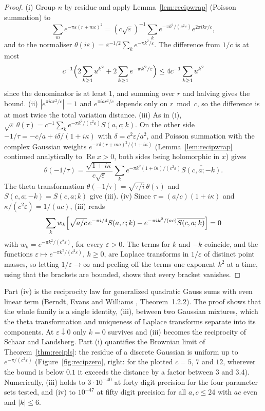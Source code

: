 \begin{proof}
(i) Group $n$ by residue and apply Lemma~\ref{lem:recipwrap} (Poisson summation) to
\[
\sum_me^{-\pi\varepsilon(r+mc)^2}=(c\sqrt\varepsilon)^{-1}\sum_ke^{-\pi k^2/(c^2\varepsilon)}e^{2\pi ikr/c},
\]
and to the normaliser $\theta(i\varepsilon)=\varepsilon^{-1/2}\sum_ke^{-\pi k^2/\varepsilon}$. The difference from $1/c$ is at most
\[
c^{-1}\Bigl(2\sum_{k\ge1}u^{k^2}+2\sum_{k\ge1}e^{-\pi k^2/\varepsilon}\Bigr)\le4c^{-1}\sum_{k\ge1}u^{k^2}
\]
since the denominator is at least $1$, and summing over $r$ and halving gives the bound. (ii) $|e^{\pi iar^2/c}|=1$ and $e^{\pi iar^2/c}$ depends only on $r\bmod c$, so the difference is at most twice the total variation distance. (iii) As in (i), $\sqrt\varepsilon\,\theta(\tau)=c^{-1}\sum_ke^{-\pi k^2/(c^2\varepsilon)}S(a,c;k)$. On the other side $-1/\tau=-c/a+i\delta/(1+i\kappa)$ with $\delta=c^2\varepsilon/a^2$, and Poisson summation with the complex Gaussian weights $e^{-\pi\delta(r+ma)^2/(1+i\kappa)}$ (Lemma~\ref{lem:recipwrap} continued analytically to $\operatorname{Re}x>0$, both sides being holomorphic in $x$) gives
\[
\theta(-1/\tau)=\frac{\sqrt{1+i\kappa}}{c\sqrt\varepsilon}\sum_ke^{-\pi k^2(1+i\kappa)/(c^2\varepsilon)}\overline{S(c,a;-k)}.
\] The theta transformation $\theta(-1/\tau)=\sqrt{\tau/i}\,\theta(\tau)$ and $S(c,a;-k)=S(c,a;k)$ give (iii). (iv) Since $\tau=(a/c)(1+i\kappa)$ and $\kappa/(c^2\varepsilon)=1/(ac)$, (iii) reads
\[
\sum_kw_k\Bigl[\sqrt{a/c}\,e^{-\pi i/4}S(a,c;k)-e^{-\pi ik^2/(ac)}\overline{S(c,a;k)}\Bigr]=0
\]
with $w_k=e^{-\pi k^2/(c^2\varepsilon)}$, for every $\varepsilon>0$. The terms for $k$ and $-k$ coincide, and the functions $\varepsilon\mapsto e^{-\pi k^2/(c^2\varepsilon)}$, $k\ge0$, are Laplace transforms in $1/\varepsilon$ of distinct point masses, so letting $1/\varepsilon\to\infty$ and peeling off the terms one exponent $k^2$ at a time, using that the brackets are bounded, shows that every bracket vanishes.
\end{proof}

Part (iv) is the reciprocity law for generalized quadratic Gauss sums with even linear term (Berndt, Evans and Williams \cite{bew1998}, Theorem~1.2.2). The proof shows that the whole family is a single identity, (iii), between two Gaussian mixtures, which the theta transformation and uniqueness of Laplace transforms separate into its components. At $\varepsilon\downarrow0$ only $k=0$ survives and (iii) becomes the reciprocity of Schaar and Landsberg. Part (i) quantifies the Brownian limit of Theorem~\ref{thm:recipls}: the residue of a discrete Gaussian is uniform up to $e^{-\pi/(c^2\varepsilon)}$ (Figure~\ref{fig:recipzero}, right: for the plotted $c=5$, $7$ and $12$, wherever the bound is below $0.1$ it exceeds the distance by a factor between $3$ and $3.4$). Numerically, (iii) holds to $3\cdot10^{-40}$ at forty digit precision for the four parameter sets tested, and (iv) to $10^{-47}$ at fifty digit precision for all $a,c\le24$ with $ac$ even and $|k|\le6$.

